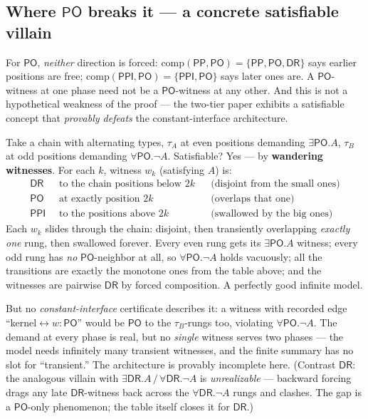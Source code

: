 \documentclass[11pt]{article}
\newcommand{\DR}{\ensuremath{\mathsf{DR}}}
\newcommand{\PO}{\ensuremath{\mathsf{PO}}}
\newcommand{\PP}{\ensuremath{\mathsf{PP}}}
\newcommand{\PPI}{\ensuremath{\mathsf{PPI}}}
\newcommand{\Comp}{\mathrm{comp}}
\begin{document}
\subsection{Where $\PO$ breaks it --- a concrete satisfiable
villain}\label{ssec:villain}

For $\PO$, \emph{neither} direction is forced:
$\Comp(\PP,\PO)=\{\PP,\PO,\DR\}$ says earlier positions are free;
$\Comp(\PPI,\PO)=\{\PPI,\PO\}$ says later ones are. A $\PO$-witness at
one phase need not be a $\PO$-witness at any other. And this is not a
hypothetical weakness of the proof --- the two-tier paper exhibits a
satisfiable concept that \emph{provably defeats} the constant-interface
architecture.

Take a chain with alternating types, $\tau_A$ at even positions
demanding $\exists\PO.A$, $\tau_B$ at odd positions demanding
$\forall\PO.\neg A$. Satisfiable? Yes --- by \textbf{wandering
witnesses}. For each $k$, witness $w_k$ (satisfying $A$) is:
\[
\begin{aligned}
\DR  &\ \text{ to the chain positions below } 2k
      &&\text{(disjoint from the small ones)}\\
\PO  &\ \text{ at exactly position } 2k
      &&\text{(overlaps that one)}\\
\PPI &\ \text{ to the positions above } 2k
      &&\text{(swallowed by the big ones)}
\end{aligned}
\]
Each $w_k$ slides through the chain: disjoint, then transiently
overlapping \emph{exactly one} rung, then swallowed forever. Every even
rung gets its $\exists\PO.A$ witness; every odd rung has \emph{no}
$\PO$-neighbor at all, so $\forall\PO.\neg A$ holds vacuously; all the
transitions are exactly the monotone ones from the table above; and the
witnesses are pairwise $\DR$ by forced composition. A perfectly good
infinite model.

But no \emph{constant-interface} certificate describes it: a witness
with recorded edge ``kernel${}\leftrightarrow w:\PO$'' would be $\PO$
to the $\tau_B$-rungs too, violating $\forall\PO.\neg A$. The demand at
every phase is real, but no \emph{single} witness serves two phases ---
the model needs infinitely many transient witnesses, and the finite
summary has no slot for ``transient.'' The architecture is provably
incomplete here. (Contrast $\DR$: the analogous villain with
$\exists\DR.A\,/\,\forall\DR.\neg A$ is \emph{unrealizable} ---
backward forcing drags any late $\DR$-witness back across the
$\forall\DR.\neg A$ rungs and clashes. The gap is a $\PO$-only
phenomenon; the table itself closes it for $\DR$.)
\end{document}
